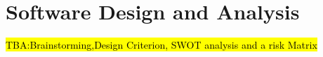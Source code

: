 \let\textcircled=\pgftextcircled
\chapter{Software Design and Analysis}
\label{chap:intro}

\hl{TBA:Brainstorming,Design Criterion, SWOT analysis and a risk Matrix}